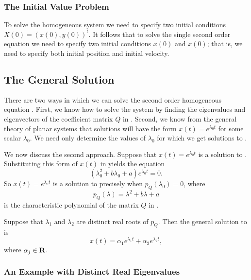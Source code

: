 \documentclass{ximera}
\begin{document}
\subsubsection*{The Initial Value Problem}

To solve the homogeneous system  we need to specify
two initial conditions $X(0)=(x(0),y(0))^t$.  It follows that to
solve the single second order equation we need to specify two initial
conditions $x(0)$ and $\dot{x}(0)$; that is, we need to specify
both initial position and
initial velocity.

\subsection*{The General Solution}

There are two ways in which we can solve
the second order homogeneous equation .  First,
we know how to solve the system  by finding the
eigenvalues and eigenvectors of the coefficient matrix $Q$ in
.  Second, we know from the general theory of
planar systems that solutions will have the form $x(t)=e^{\lambda_0t}$
for some scalar $\lambda_0$.  We need only determine the values of
$\lambda_0$ for which we get solutions to .

We now discuss the second approach.  Suppose that $x(t)=e^{\lambda_0t}$
is a solution to .  Substituting this form of $x(t)$ in
 yields the equation
\[
\left(\lambda_0^2 + b\lambda_0 + a\right)e^{\lambda_0t} = 0.
\]
So $x(t)=e^{\lambda_0t}$ is a solution to  precisely
when $p_Q(\lambda_0)=0$, where
\begin{equation} \label{E:charQ}
p_Q(\lambda) = \lambda^2 + b\lambda + a
\end{equation}
is the characteristic polynomial of the matrix $Q$ in .

Suppose that $\lambda_1$ and $\lambda_2$ are distinct real roots of $p_Q$.
Then the general solution to  is
\[
x(t) = \alpha_1e^{\lambda_1t} +  \alpha_2e^{\lambda_2t},
\]
where $\alpha_j\in\mbox{$\bf{R}$}$.

\subsubsection*{An Example with Distinct Real Eigenvalues}
\end{document}
